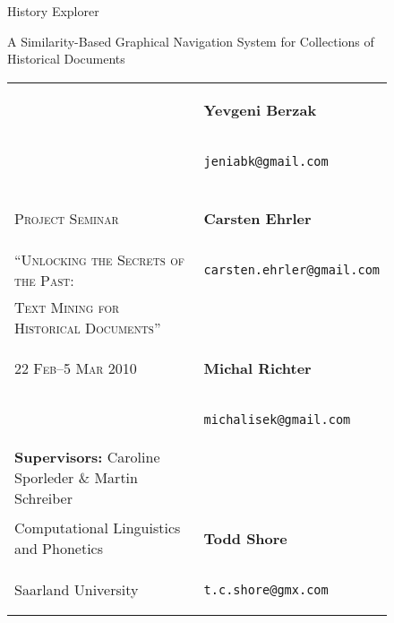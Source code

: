 \documentclass[paper=a4,draft=false]{scrartcl}
\begin{document}
\ifpdf
{}
\else
{}
\fi


\begin{titlepage}
\begin{figure}[ht]
\sc\centering
\vspace{20mm}
  \begin{Huge}
     History Explorer\\
  \end{Huge}
  \vspace{20mm}
  \begin{Large}A Similarity-Based Graphical Navigation System for Collections of Historical Documents\end{Large}
\end{figure}

	\begin{figure}[b]
    \begin{tabular}{l l}
    \vspace{10mm}
      & \begin{large}\textbf{Yevgeni Berzak}\end{large} \\
      & \begin{large}\texttt{jeniabk@gmail.com} \end{large}\\
      \\
      \textsc{Project Seminar} & \begin{large}\textbf{Carsten Ehrler}\end{large} \\
       \textsc{``Unlocking the Secrets of the Past:} & \begin{large}\texttt{carsten.ehrler@gmail.com} \end{large}\\
        \textsc{Text Mining for Historical Documents''} & \\
       \textsc{22 Feb--5 Mar 2010} & \begin{large}\textbf{Michal Richter}\end{large} \\
       & \begin{large}\texttt{michalisek@gmail.com} \end{large}\\
      \textbf{Supervisors:} Caroline Sporleder \& Martin Schreiber & \\
      Computational Linguistics and Phonetics & \begin{large}\textbf{Todd Shore}\end{large} \\
      Saarland University & \begin{large}\texttt{t.c.shore@gmx.com} \end{large}
    \end{tabular}
    \end{figure}
\end{titlepage}
\pagebreak
\end{document}
